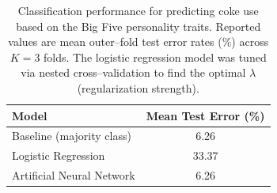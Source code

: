 
\begin{table}[H]
    \centering
    \caption{Classification performance for predicting coke use based on the Big Five personality traits.
    Reported values are mean outer–fold test error rates (\%) across $K = 3$ folds.
    The logistic regression model was tuned via nested cross–validation to find the optimal $\lambda$ (regularization strength).}
    \label{tab:classification:coke}
    \begin{tabular}{l c}
        \toprule
        \textbf{Model} & \textbf{Mean Test Error (\%)} \\
        \midrule
        Baseline (majority class) & 6.26 \\
        Logistic Regression & 33.37 \\
        Artificial Neural Network & 6.26 \\
        \bottomrule
    \end{tabular}
\end{table}
